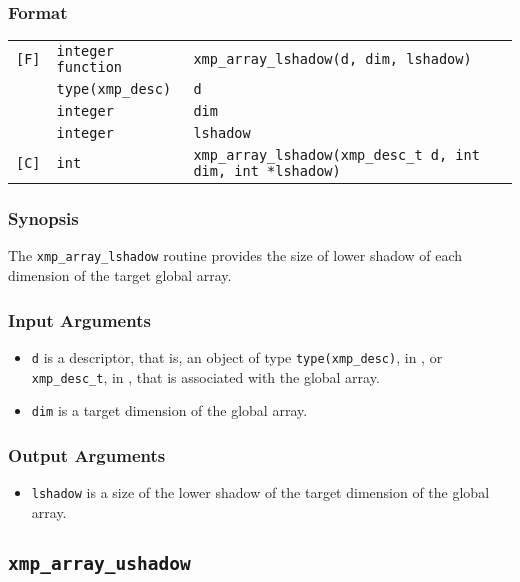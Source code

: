 \subsubsection*{Format}

\begin{tabular}{lll}

\verb![F]!& {\tt integer function}& {\tt xmp\_array\_lshadow(d, dim, lshadow)}\\
          & {\tt type(xmp\_desc)} & {\tt d}\\
          & {\tt integer} & {\tt dim}\\
          & {\tt integer} & {\tt lshadow}\\

\verb![C]!&  {\tt int}& {\tt xmp\_array\_lshadow(xmp\_desc\_t d, int dim, int *lshadow)}\\

\end{tabular}

\subsubsection*{Synopsis}

The {\tt xmp\_array\_lshadow} routine provides the size of lower shadow of each dimension of the target global array.


\subsubsection*{Input Arguments}
\begin{itemize}
 \item {\tt d} is a descriptor, that is, an object of type 
       {\tt type(xmp\_desc)}, in {\XMPF}, or {\tt xmp\_desc\_t},
       in {\XMPC}, that is associated with the global array.
 \item {\tt dim} is a target dimension of the global array.
\end{itemize}

\subsubsection*{Output Arguments}
\begin{itemize}
 \item {\tt lshadow} is a size of the lower shadow of the target dimension of the global array.
\end{itemize}


\subsection{\tt xmp\_array\_ushadow}

